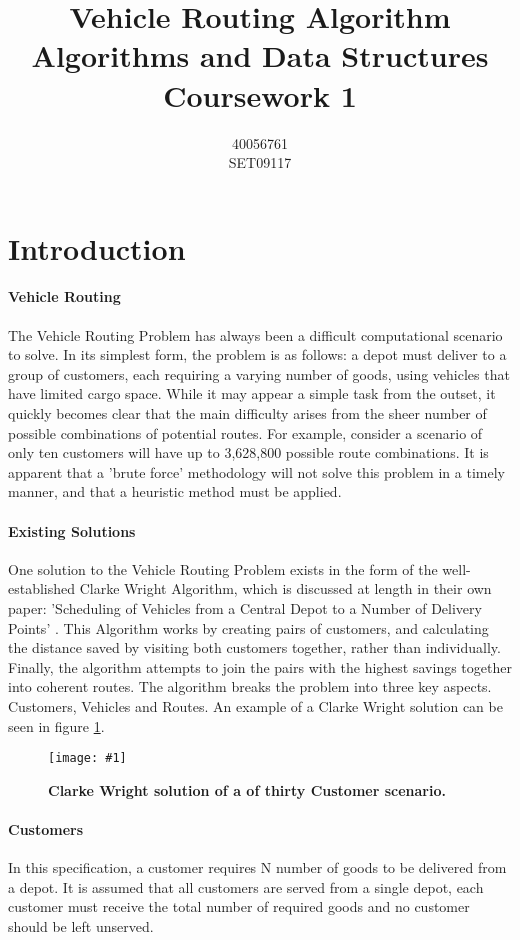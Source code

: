 \documentclass[conference]{acmsiggraph}
\title{Vehicle Routing Algorithm\\Algorithms and Data Structures\\Coursework 1}
\author{40056761\\SET09117}
\newcommand{\figuremacroW}[4]{
	\begin{figure}[h] %
		\centering
		\texttt{[image: \#1]}
		\caption[#2]{\textbf{#2}  #3}
		\label{fig:#1}
	\end{figure}
}
\begin{document}
\fancyfoot{\thepage}
	\maketitle	
	\section{Introduction}
	
		\paragraph{Vehicle Routing}
		The Vehicle Routing Problem has always been a difficult computational scenario to solve. In its simplest form, the problem is as follows: a depot must deliver to a group of customers, each requiring a varying number of goods, using vehicles that have limited cargo space. While it may appear a simple task from the outset, it quickly becomes clear that the main difficulty arises from the sheer number of possible combinations of potential routes. For example, consider a scenario of only ten customers will have up to 3,628,800 possible route combinations. It is apparent that a 'brute force' methodology will not solve this problem in a timely manner, and that a heuristic method must be applied.
		
		\paragraph{Existing Solutions}
		One solution to the Vehicle Routing Problem exists in the form of the well-established Clarke Wright Algorithm, which is discussed at length in their own paper: 'Scheduling of Vehicles from a Central Depot to a Number of Delivery Points' \cite{CW}. This Algorithm works by creating pairs of customers, and calculating the distance saved by visiting both customers together, rather than individually. Finally, the algorithm attempts to join the pairs with the highest savings together into coherent routes. The algorithm breaks the problem into three key aspects. Customers, Vehicles and Routes. An example of a Clarke Wright solution can be seen in figure \ref{fig:cw30}. 
		
		\figuremacroW
		{cw30}
		{Clarke Wright solution of a of thirty Customer scenario.}
		{}
		{0.75}
						
		\paragraph{Customers}
		In this specification, a customer requires N number of goods to be delivered from a depot. It is assumed that all customers are served from a single depot, each customer must receive the total number of required goods and no customer should be left unserved.
		
\end{document}

